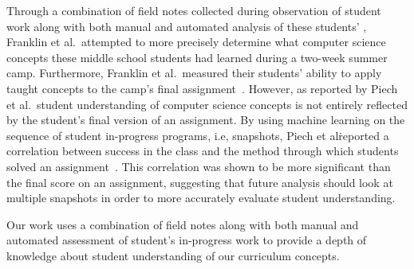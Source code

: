 Through a combination of field notes collected during observation of student
work along with both manual and automated analysis of these students'
, Franklin et al.\ attempted to more precisely determine what
computer science concepts these middle school students had learned during a
two-week summer camp. Furthermore, Franklin et al.\ measured their students'
ability to apply taught concepts to the camp's final
assignment~\cite{Boe:2013:HLS:2445196.2445265, Franklin:2013:SBO}. However, as
reported by Piech et al.\, student understanding of computer science concepts
is not entirely reflected by the student's final version of an assignment. By
using machine learning on the sequence of student in-progress programs, i.e,
snapshots, Piech et al\. reported a correlation between success in the class
and the method through which students solved an
assignment~\cite{Piech:2012:MSL:2157136.2157182}. This correlation was shown to
be more significant than the final score on an assignment, suggesting that
future analysis should look at multiple snapshots in order to more accurately
evaluate student understanding.

Our work uses a combination of field notes along with both manual and automated
assessment of student's in-progress work to provide a depth of knowledge about
student understanding of our curriculum concepts.
